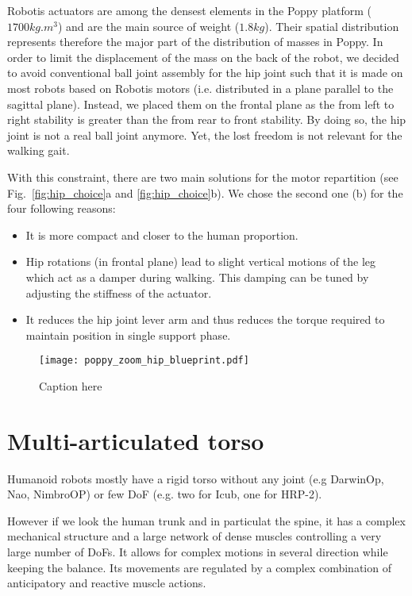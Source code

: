Robotis actuators are among the densest elements in the Poppy platform ($ 1700 kg.m^{3} $) and are the main source of weight ($1.8 kg$). Their spatial distribution represents therefore the major part of the distribution of masses in Poppy. In order to limit the displacement of the mass on the back of the robot, we decided to avoid conventional ball joint assembly for the hip joint such that it is made on most robots based on Robotis motors (i.e. distributed in a plane parallel to the sagittal plane). Instead, we placed them on the frontal plane as the from left to right stability is greater than the from rear to front stability. By doing so, the hip joint is not a real ball joint anymore. Yet, the lost freedom is not relevant for the walking gait.


With this constraint, there are two main solutions for the motor repartition (see Fig.~\ref{fig:hip_choice}a and \ref{fig:hip_choice}b). We chose the second one (b) for the four following reasons:

\begin{itemize}
    \item It is more compact and closer to the human proportion.
    \item Hip rotations (in frontal plane) lead to slight vertical motions of the leg which act as a damper during walking. This damping can be tuned by adjusting the stiffness of the actuator.
    \item It reduces the hip joint lever arm and thus reduces the torque required to maintain position in single support phase.
\end{itemize}


\begin{figure}[p]
    \begin{center}
        \texttt{[image: poppy\_zoom\_hip\_blueprint.pdf]}
    \end{center}
    \caption{Caption here}
    \label{fig:figure1}
\end{figure}




\section{Multi-articulated torso} %

Humanoid robots mostly have a rigid torso without any joint (e.g DarwinOp, Nao, NimbroOP) or few DoF (e.g. two for Icub, one for HRP-2).

However if we look the human trunk and in particulat the spine, it has a complex mechanical structure and a large network of dense muscles controlling a very large number of DoFs. It allows for complex motions in several direction while keeping the balance. Its movements are regulated by a complex combination of anticipatory and reactive muscle actions.

